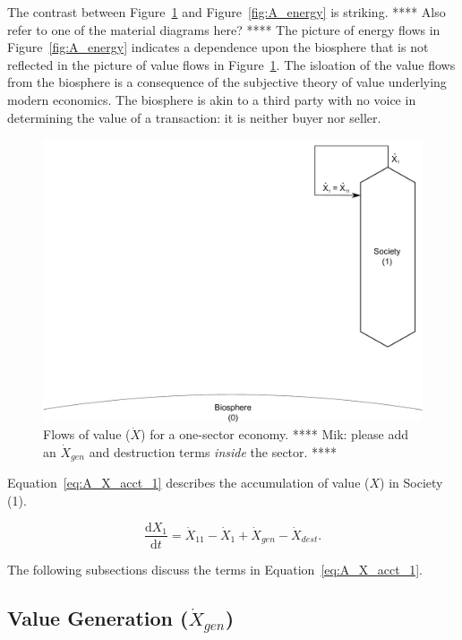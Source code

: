 The contrast between Figure~\ref{fig:A_value} and Figure~\ref{fig:A_energy}
is striking. **** Also refer to one of the material diagrams here? ****
The picture of energy flows in Figure~\ref{fig:A_energy} indicates a dependence
upon the biosphere that is not reflected in the picture of
value flows in Figure~\ref{fig:A_value}.
The isloation of the value flows from the biosphere is a consequence
of the subjective theory of value 
underlying modern economics.
The biosphere is akin to a third party with no voice 
in determining the value of a transaction:
it is neither buyer nor seller. 

\begin{figure}[h!]
\centering
\includegraphics[width=0.8\linewidth]{Part_3/Chapter_Values/images/1_sector_value.pdf}
\caption{Flows of value ($\dot{X}$) for a one-sector economy. 
**** Mik: please add an $\dot{X}_{gen}$ and destruction terms \emph{inside} the sector. ****}
\label{fig:A_value} 
\end{figure}

Equation~\ref{eq:A_X_acct_1} describes the accumulation 
of value
($X$) in Society (1).

\begin{equation} \label{eq:A_X_acct_1}
	\frac{\mathrm{d}X_{1}}{\mathrm{d}t} 
	= \dot{X}_{11} 
	- \dot{X}_{1}
	+ \dot{X}_{gen}
	- \dot{X}_{dest}.
\end{equation}

The following subsections discuss the terms in Equation~\ref{eq:A_X_acct_1}.


\subsection{Value Generation ($\dot{X}_{gen}$)}

